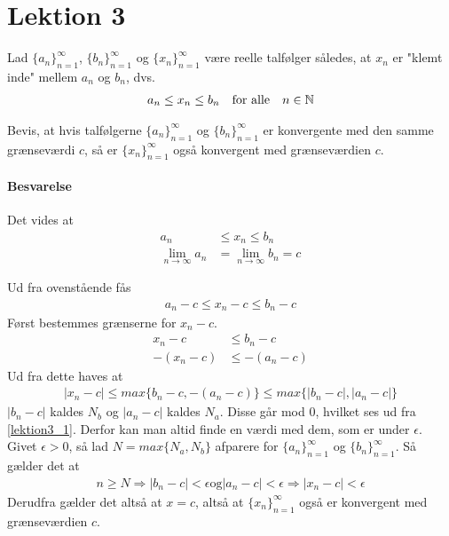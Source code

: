 \chapter{Lektion 3}

Lad $\{a_n\}^\infty_{n=1}$, $\{b_n\}^\infty_{n=1}$ og $\{x_n\}^\infty_{n=1}$ være reelle talfølger således, at $x_n$ er "klemt inde" mellem $a_n$ og $b_n$, dvs.
%
\begin{align*}
    a_n \leq x_n \leq b_n \quad \text{for alle} \quad n\in \mathbb{N}
\end{align*}

Bevis, at hvis talfølgerne $\{a_n\}^\infty_{n=1}$ og $\{b_n\}^\infty_{n=1}$ er konvergente med den samme grænseværdi $c$, så er $\{x_n\}^\infty_{n=1}$ også konvergent med grænseværdien $c$.

\subsubsection{Besvarelse}
Det vides at
\begin{align}
a_n &\leq x_n \leq b_n \nonumber \\
\lim_{n\rightarrow \infty} a_n &= \lim_{n\rightarrow \infty} b_n = c \label{lektion3_1}
\end{align}

\begin{bev} \textbf{} %
\newline
Ud fra ovenstående fås
\begin{align*}
    a_n - c \leq x_n - c \leq b_n - c
\end{align*}
Først bestemmes grænserne for $x_n-c$. 
\begin{align*}
    x_n - c &\leq b_n - c\\
    -(x_n - c) &\leq -(a_n - c)
\end{align*}
Ud fra dette haves at 
\begin{align*}
    |x_n - c| \leq max\{b_n-c, -(a_n - c)\} \leq max\{|b_n-c|, |a_n - c|\}
\end{align*}
$|b_n-c|$ kaldes $N_b$ og $|a_n - c|$ kaldes $N_a$. Disse går mod 0, hvilket ses ud fra \autoref{lektion3_1}. Derfor kan man altid finde en værdi med dem, som er under $\epsilon$. Givet $\epsilon>0$, så lad $N=max\{N_a,N_b\}$ afparere for $\{a_n\}^\infty_{n=1}$ og $\{b_n\}^\infty_{n=1}$. Så gælder det at
\begin{align*}
    n\geq N \Rightarrow |b_n-c|<\epsilon \text{og} |a_n-c|<\epsilon \Rightarrow |x_n - c| < \epsilon
\end{align*}
Derudfra gælder det altså at $x=c$, altså at $\{x_n\}^\infty_{n=1}$ også er konvergent med grænseværdien $c$.
\end{bev}